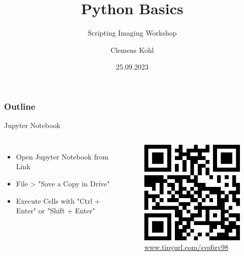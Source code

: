 \documentclass[compress%
,aspectratio=169%
]{beamer}
\title{Python Basics}
\subtitle{Scripting Imaging Workshop}
\author{Clemens Kohl}
\institute{Max Planck Institute for Molecular Genetics}
\date{25.09.2023}
\begin{document}
\maketitle

\begin{frame}
	\frametitle{Outline}
	\tableofcontents[hideallsubsections]
\end{frame}

\begin{frame}{Jupyter Notebook}
\begin{columns}
    \begin{itemize}
    \item Open Jupyter Notebook from Link
    \item File > "Save a Copy in Drive"
    \item Execute Cells with "Ctrl + Enter" or "Shift + Enter"
\end{itemize}
    \begin{figure}
    \centering
    \includegraphics[width = 0.7\linewidth]{img/link.png}
    \caption{\alert{\url{www.tinyurl.com/sva6zv98}}}
\end{figure}
\end{columns}
\end{frame}
\end{document}

